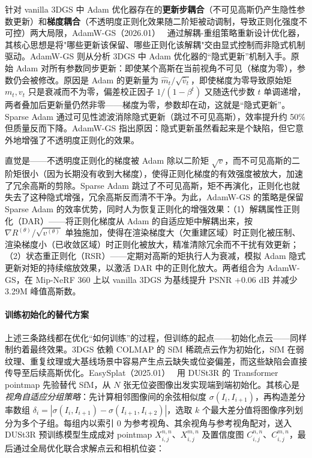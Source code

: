 针对 vanilla 3DGS 中 Adam 优化器存在的\textbf{更新步耦合}（不可见高斯仍产生隐性参数更新）和\textbf{梯度耦合}（不透明度正则化效果随二阶矩被动调制，导致正则化强度不可控）两大局限，AdamW-GS（2026.01）~\cite{2601_16736} 通过解耦-重组策略重新设计优化器，其核心思想是将"哪些更新该保留、哪些正则化该解耦"交由显式控制而非隐式机制驱动。AdamW-GS 则从分析 3DGS 中 Adam 优化器的``隐式更新''机制入手。原始 Adam 对所有参数同步更新：即使某个高斯在当前视角不可见（梯度为零），参数仍会被修改。原因是 Adam 的更新量为 $\hat{m}_t / \sqrt{\hat{v}_t}$，即使梯度为零导致原始矩 $m_t, v_t$ 只是衰减而不为零，偏差校正因子 $1/(1-\beta^t)$ 又随迭代步数 $t$ 单调递增，两者叠加后更新量仍然非零——梯度为零，参数却在动，这就是``隐式更新''。Sparse Adam 通过可见性滤波消除隐式更新（跳过不可见高斯），效率提升约 50\% 但质量反而下降。AdamW-GS 指出原因：隐式更新虽然看起来是个缺陷，但它意外地增强了不透明度正则化的效果。

直觉是——不透明度正则化的梯度被 Adam 除以二阶矩 $\sqrt{v}$，而不可见高斯的二阶矩很小（因为长期没有收到大梯度），使得正则化梯度的有效强度被放大，加速了冗余高斯的剪除。Sparse Adam 跳过了不可见高斯，矩不再演化，正则化也就失去了这种隐式增强，冗余高斯反而清不干净。为此，AdamW-GS 的策略是保留 Sparse Adam 的效率优势，同时人为恢复正则化的增强效果：（1）解耦属性正则化（DAR）——将正则化梯度从 Adam 的自适应矩中解耦出来，按 $\nabla R^{(\theta)} / \sqrt{v^{(\theta)}}$ 单独施加，使得在渲染梯度大（欠重建区域）时正则化被压制、渲染梯度小（已收敛区域）时正则化被放大，精准清除冗余而不干扰有效更新；（2）状态重正则化（RSR）——定期对高斯的矩执行人为衰减，模拟 Adam 隐式更新对矩的持续缩放效果，以激活 DAR 中的正则化放大。两者组合为 AdamW-GS，在 Mip-NeRF 360 上以 vanilla 3DGS 为基线提升 PSNR +0.06 dB 并减少 3.29M 峰值高斯数。

\paragraph{训练初始化的替代方案}

上述三条路线都在优化``如何训练''的过程，但训练的起点——初始化点云——同样制约着最终效果。3DGS 依赖 COLMAP 的 SfM 稀疏点云作为初始化，SfM 在弱纹理、重复纹理或大基线场景中容易产生点云缺失或位姿偏差，而这些缺陷会直接传导至后续高斯优化。EasySplat（2025.01）~\cite{2501_01003} 用 DUSt3R 的 Transformer pointmap 先验替代 SfM，从 $N$ 张无位姿图像出发实现端到端初始化。其核心是\emph{视角自适应分组策略}：先计算相邻图像间的余弦相似度 $\sigma(I_i, I_{i+1})$，再构造差分率数组 $\delta_i = |\sigma(I_i, I_{i+1}) - \sigma(I_{i+1}, I_{i+2})|$，选取 $k$ 个最大差分值将图像序列划分为多个子组。每组内以索引 0 为参考视角、其余视角与参考视角配对，送入 DUSt3R 预训练模型生成成对 pointmap $X_{i,j}^{n,n}$、$X_{i,j}^{m,n}$ 及置信度图 $C_{i,j}^{n,n}$、$C_{i,j}^{m,n}$，最后通过全局优化联合求解点云和相机位姿：

